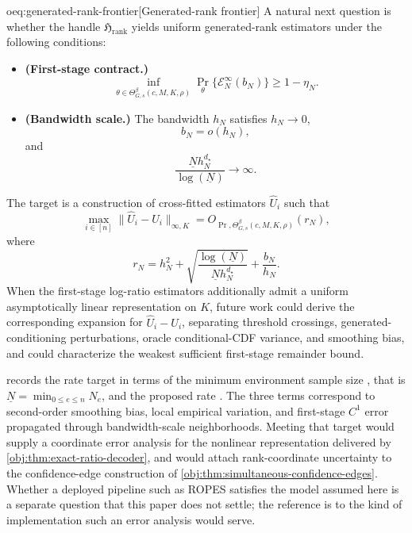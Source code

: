 \documentclass[11pt]{article}
\begin{document}
\begin{remarkv}{oeq:generated-rank-frontier}[Generated-rank frontier]
A natural next question is whether the handle \(\mathfrak H_{\mathrm{rank}}\) yields uniform generated-rank estimators under the following conditions:
\begin{itemize}
\item \textbf{(First-stage contract.)}
\[
\inf_{\theta\in\Theta^{\beta}_{G,s}(c,M,K,\rho)}
\Pr_\theta\{\mathcal E_N^{\infty}(b_N)\}\ge 1-\eta_N .
\]
\item \textbf{(Bandwidth scale.)} The bandwidth \(h_N\) satisfies \(h_N\to0\),
\[
b_N=o(h_N),
\]
and
\[
\frac{\underline N h_N^{d_\star}}{\log(\underline N)}\to\infty .
\]
\end{itemize}
The target is a construction of cross-fitted estimators \(\widehat U_i\) such that
\[
\max_{i\in[n]}\|\widehat U_i-U_i\|_{\infty,K}
=
O_{\Pr,\Theta^{\beta}_{G,s}(c,M,K,\rho)}(r_N),
\]
where
\[
r_N
=
h_N^2+
\sqrt{\frac{\log(\underline N)}{\underline N h_N^{d_\star}}}
+\frac{b_N}{h_N}.
\]
When the first-stage log-ratio estimators additionally admit a uniform asymptotically linear representation on \(K\), future work could derive the corresponding expansion for \(\widehat U_i-U_i\), separating threshold crossings, generated-conditioning perturbations, oracle conditional-CDF variance, and smoothing bias, and could characterize the weakest sufficient first-stage remainder bound.
\end{remarkv}

 records the rate target in terms of the minimum environment sample size , that is \(\underline N=\min_{0\le e\le n}N_e\), and the proposed rate . The three terms correspond to second-order smoothing bias, local empirical variation, and first-stage \(C^1\) error propagated through bandwidth-scale neighborhoods. Meeting that target would supply a coordinate error analysis for the nonlinear representation delivered by \cref{obj:thm:exact-ratio-decoder}, and would attach rank-coordinate uncertainty to the confidence-edge construction of \cref{obj:thm:simultaneous-confidence-edges}. Whether a deployed pipeline such as ROPES \citep{ROPES2025} satisfies the model assumed here is a separate question that this paper does not settle; the reference is to the kind of implementation such an error analysis would serve.
\end{document}
